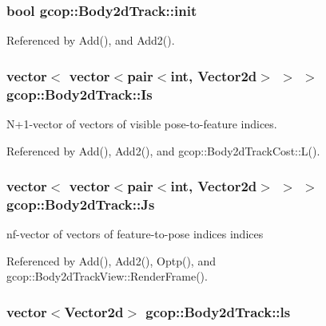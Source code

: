 \subsubsection[{init}]{\setlength{\rightskip}{0pt plus 5cm}bool {\bf gcop\-::\-Body2d\-Track\-::init}}\label{classgcop_1_1Body2dTrack_ac79196b2b9ba7f1a1869c51f475dabd5}


\-Referenced by \-Add(), and \-Add2().

\subsubsection[{\-Is}]{\setlength{\rightskip}{0pt plus 5cm}vector$<$ vector$<$pair$<$int, \-Vector2d$>$ $>$ $>$ {\bf gcop\-::\-Body2d\-Track\-::\-Is}}\label{classgcop_1_1Body2dTrack_a5d55c274c019aaae6639286675fbecce}


\-N+1-\/vector of vectors of visible pose-\/to-\/feature indices. 



\-Referenced by \-Add(), \-Add2(), and gcop\-::\-Body2d\-Track\-Cost\-::\-L().

\subsubsection[{\-Js}]{\setlength{\rightskip}{0pt plus 5cm}vector$<$ vector$<$pair$<$int, \-Vector2d$>$ $>$ $>$ {\bf gcop\-::\-Body2d\-Track\-::\-Js}}\label{classgcop_1_1Body2dTrack_a91423be930f19b4ba67f70020462c5ad}


nf-\/vector of vectors of feature-\/to-\/pose indices indices 



\-Referenced by \-Add(), \-Add2(), \-Optp(), and gcop\-::\-Body2d\-Track\-View\-::\-Render\-Frame().

\subsubsection[{ls}]{\setlength{\rightskip}{0pt plus 5cm}vector$<$\-Vector2d$>$ {\bf gcop\-::\-Body2d\-Track\-::ls}}\label{classgcop_1_1Body2dTrack_af7c669c1e15354a24234059c3a056040}


